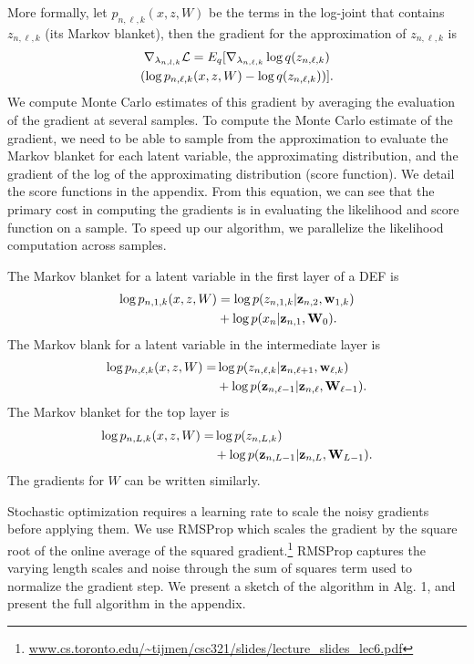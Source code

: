 \documentclass[twoside]{article}
\begin{document}
More formally, 
let $p_{n, \ell, k} (x, z, W)$ be the terms in the log-joint that contains $z_{n, \ell, k}$ (its Markov
blanket), then the gradient for the approximation of $z_{n, \ell, k}$ is
\begin{multline*}
\nabla_{\lambda_{n,l,k}}{\cal L} = E_{q}[\nabla_{\lambda_{n,\ell, k}}  \log q(z_{n, \ell, k}) 
\\(\log p_{n, \ell, k} (x, z, W) - \log q(z_{n, \ell, k}))].
\end{multline*}
We compute Monte Carlo estimates of this gradient by averaging the evaluation of
the gradient at several samples.
To compute the Monte Carlo estimate of the gradient, we need to be able to sample
from the approximation to evaluate the Markov 
blanket for each latent variable, the approximating distribution, and the gradient of the
log of the approximating distribution (score function). We detail the score functions in the appendix.
From this equation, we can see that the primary cost in computing the gradients is in evaluating
the likelihood and score function on a sample. 
To speed up our algorithm, we parallelize the likelihood computation across
samples.

The Markov blanket for a latent variable in the first layer of a DEF is
\begin{align}
\log p_{n, 1, k} (x, z, W) &= \log p (z_{n, 1, k} | \boldsymbol{\mathbf{z}}_{n, 2},  \boldsymbol{\mathbf{w}}_{1, k}) \nonumber \\
&+ \log p (x_n | \boldsymbol{\mathbf{z}}_{n, 1}, \boldsymbol{\mathbf{W}}_{0}).
 \label{eq:mb1}
\end{align}
The Markov blank for a latent variable in the intermediate layer is
\begin{align}
\log p_{n, \ell, k} (x, z, W) =& \log p (z_{n, \ell, k} | \boldsymbol{\mathbf{z}}_{n, \ell + 1}, \boldsymbol{\mathbf{w}}_{\ell, k}) \nonumber \\
&+ \log p (\boldsymbol{\mathbf{z}}_{n, \ell - 1} | \boldsymbol{\mathbf{z}}_{n, \ell}, \boldsymbol{\mathbf{W}}_{\ell -1}).
 \label{eq:mb2}
\end{align}
The Markov blanket for the top layer is
\begin{align}
\log p_{n, L, k} (x, z, W) =& \log p (z_{n, L, k}) \nonumber \\
&+ \log p (\boldsymbol{\mathbf{z}}_{n, L - 1} | \boldsymbol{\mathbf{z}}_{n, L}, \boldsymbol{\mathbf{W}}_{L - 1}).
 \label{eq:mb3}
\end{align}
The gradients for $W$ can be written similarly.

Stochastic optimization requires a learning rate to scale the noisy gradients before applying them. 
We use RMSProp which scales the gradient by the square 
root of the online average of the squared gradient.\footnote{\tiny\url{www.cs.toronto.edu/~tijmen/csc321/slides/lecture_slides_lec6.pdf}}
 RMSProp captures the varying length scales and noise through 
the sum of squares term used to normalize the gradient step. We present a sketch of the algorithm in Alg. 1,
and present the full algorithm in the appendix.
\end{document}
